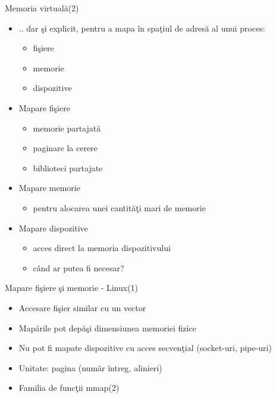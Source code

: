 \documentclass{so.cs.pub.ro}
\begin{document}
\begin{frame}{Memoria virtuală(2)}
\begin{itemize}
  \item .. dar şi explicit, pentru a mapa în spaţiul de adresă al unui proces:
  \begin{itemize}
    \item fişiere
    \item memorie
    \item dispozitive
  \end{itemize}
\end{itemize}
\begin{itemize}
  \item Mapare fişiere
  \begin{itemize}
    \item memorie partajată
    \item paginare la cerere
    \item biblioteci partajate
  \end{itemize}
\end{itemize}
\begin{itemize}
  \item Mapare memorie
  \begin{itemize}
    \item pentru alocarea unei cantităţi mari de memorie
  \end{itemize}
\end{itemize}
\begin{itemize}
  \item Mapare dispozitive
  \begin{itemize}
    \item acces direct la memoria dispozitivului
    \item când ar putea fi necesar?
  \end{itemize}
\end{itemize}
\end{frame}

\begin{frame}{Mapare fişiere şi memorie - Linux(1)}
\begin{itemize}
  \item Accesare fişier similar cu un vector
  \vspace{0.4cm}
  \item Mapările pot depăşi dimensiunea memoriei fizice
  \vspace{0.4cm}
  \item Nu pot fi mapate dispozitive cu acces secvenţial (socket-uri, pipe-uri)
  \vspace{0.4cm}
  \item Unitate: pagina (număr întreg, alinieri)
  \vspace{0.4cm}
  \item Familia de funcţii mmap(2)
\end{itemize}
\end{frame}
\end{document}
